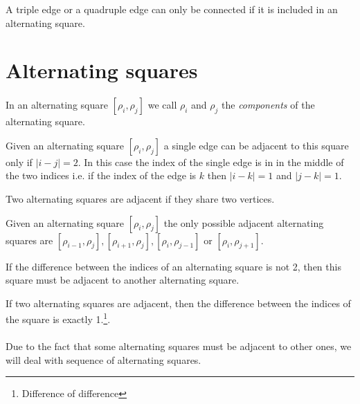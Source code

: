\begin{proposition}
  \label{continue-triple-edge}
  A triple edge or a quadruple edge can only be connected if it is included in an alternating square.
\end{proposition}

\section{Alternating squares}

\paragraph{}
In an alternating square $[\rho_i, \rho_j]$ we call $\rho_i$ and $\rho_j$ the \textit{components} of the alternating square.

\begin{proposition}
  \label{square-connection}
  Given an alternating square $[\rho_i, \rho_j]$ a single edge can be adjacent to this square only if $|i - j| = 2$. In this case the index of the single edge is in in the middle of the two indices i.e. if the index of the edge is $k$ then $|i-k| = 1$ and $|j-k| = 1$.
\end{proposition}

\begin{definition}
  Two alternating squares are adjacent if they share two vertices.
\end{definition}

\begin{proposition}
  \label{adjacent-squares}
  Given an alternating square $[\rho_i, \rho_j]$ the only possible adjacent alternating squares are $[\rho_{i-1}, \rho_j], [\rho_{i+1}, \rho_j], [\rho_i, \rho_{j-1}]$ or $[\rho_i, \rho_{j+1}]$.
\end{proposition}

\begin{corollary}
  \label{continue-alternating-square}
  If the difference between the indices of an alternating square is not 2, then this square must be adjacent to another alternating square.
\end{corollary}

\begin{corollary}
  If two alternating squares are adjacent, then the difference between the indices of the square is exactly 1.\footnote{Difference of difference}.
\end{corollary}

\paragraph{}
Due to the fact that some alternating squares must be adjacent to other ones, we will deal with sequence of alternating squares.

